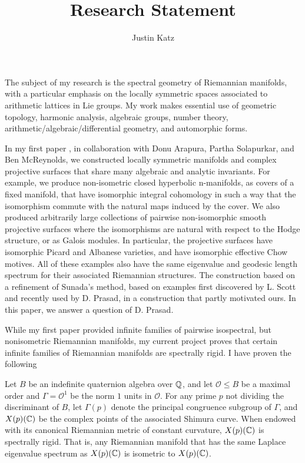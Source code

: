 \documentclass[11pt]{amsart}
\title{Research Statement}
\author{Justin Katz}
\begin{document}
\maketitle 

The subject of my research is the spectral geometry of Riemannian manifolds, with a particular emphasis on the locally symmetric spaces associated to arithmetic lattices in Lie groups. My work makes essential use of geometric topology, harmonic analysis, algebraic groups, number theory, arithmetic/algebraic/differential geometry, and automorphic forms.     


In my first paper \cite{arapura2019}, in collaboration with Donu Arapura, Partha Solapurkar, and Ben McReynolds, we constructed locally symmetric manifolds and complex projective surfaces that share many algebraic and analytic invariants. For example, we produce non-isometric closed hyperbolic n-manifolds, as covers of a fixed manifold, that have isomorphic integral cohomology in such a way that the isomorphism commute with the natural maps induced by the cover. We also produced arbitrarily large collections of pairwise non-isomorphic smooth projective surfaces where the isomorphisms are natural with respect to the Hodge structure, or as Galois modules. In particular, the projective surfaces have isomorphic Picard and Albanese varieties, and have isomorphic effective Chow motives. All of these examples also have the same eigenvalue and geodesic length spectrum for their associated Riemannian structures. The construction based on a refinement of Sunada's method, based on examples first discovered by L. Scott and recently used by D. Prasad, in a construction that partly motivated ours. In this paper, we answer a question \cite{prasad2017} of D. Prasad.

While my first paper provided infinite families of pairwise isospectral, but nonisometric Riemannian manifolds, my current project proves that certain infinite families of Riemannian manifolds are spectrally rigid. I have proven the following 
 
\begin{thm}
	Let $B$ be an indefinite quaternion algebra over $\mathbb{Q}$, and let $\mathcal{O}\leq B$ be a maximal order and $\Gamma=\mathcal{O}^1$ be the norm $1$ units in $\mathcal{O}$. For any prime $p$ not dividing the discriminant of $B$, let $\Gamma(p)$ denote the principal congruence subgroup of $\Gamma$, and $X(p)(\mathbb{C})$ be the complex points of the associated Shimura curve. When endowed with its canonical Riemannian metric of constant curvature,  $X(p)(\mathbb{C})$ is spectrally rigid. That is, any Riemannian manifold that has the same Laplace eigenvalue spectrum as $X(p)(\mathbb{C})$ is isometric to $X(p)(\mathbb{C})$.  
\end{thm}
\end{document}
